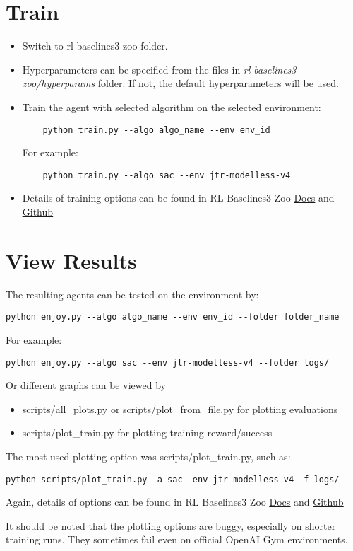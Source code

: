 \section{Train}
\begin{itemize}
    \item Switch to rl-baselines3-zoo folder.
    \item Hyperparameters can be specified from the files in \textit{rl-baselines3-zoo/hyperparams} folder. If not, the default hyperparameters will be used.
    \item Train the agent with selected algorithm on the selected environment:
    \begin{lstlisting}
    python train.py --algo algo_name --env env_id
    \end{lstlisting}
    For example:
        \begin{lstlisting}
    python train.py --algo sac --env jtr-modelless-v4
    \end{lstlisting}
    \item Details of training options can be found in RL Baselines3 Zoo \href{https://stable-baselines3.readthedocs.io/en/master/guide/rl_zoo.html}{\underline{Docs}} and \href{https://github.com/DLR-RM/rl-baselines3-zoo}{\underline{Github}}
\end{itemize}

\section{View Results}
The resulting agents can be tested on the environment by:
\begin{lstlisting}
python enjoy.py --algo algo_name --env env_id --folder folder_name
\end{lstlisting}
For example:
\begin{lstlisting}
python enjoy.py --algo sac --env jtr-modelless-v4 --folder logs/
\end{lstlisting}

\noindent
Or different graphs can be viewed by
\begin{itemize}
    \item scripts/all\_plots.py or scripts/plot\_from\_file.py for plotting evaluations
    \item scripts/plot\_train.py for plotting training reward/success
\end{itemize}

\noindent
The most used plotting option was scripts/plot\_train.py, such as:
\begin{lstlisting}
python scripts/plot_train.py -a sac -env jtr-modelless-v4 -f logs/
\end{lstlisting}

\noindent
Again, details of options can be found in RL Baselines3 Zoo \href{https://stable-baselines3.readthedocs.io/en/master/guide/rl_zoo.html}{\underline{Docs}} and \href{https://github.com/DLR-RM/rl-baselines3-zoo}{\underline{Github}}

It should be noted that the plotting options are buggy, especially on shorter training runs. They sometimes fail even on official OpenAI Gym environments.

